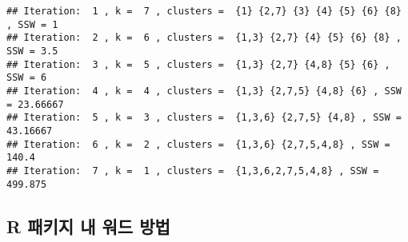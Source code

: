 \documentclass[]{book}
\newenvironment{Shaded}{\begin{snugshade}}{\end{snugshade}}
\newcommand{\CommentTok}[1]{\textcolor[rgb]{0.56,0.35,0.01}{\textit{#1}}}
\newcommand{\ControlFlowTok}[1]{\textcolor[rgb]{0.13,0.29,0.53}{\textbf{#1}}}
\newcommand{\DataTypeTok}[1]{\textcolor[rgb]{0.13,0.29,0.53}{#1}}
\newcommand{\DecValTok}[1]{\textcolor[rgb]{0.00,0.00,0.81}{#1}}
\newcommand{\KeywordTok}[1]{\textcolor[rgb]{0.13,0.29,0.53}{\textbf{#1}}}
\newcommand{\NormalTok}[1]{#1}
\newcommand{\OperatorTok}[1]{\textcolor[rgb]{0.81,0.36,0.00}{\textbf{#1}}}
\newcommand{\StringTok}[1]{\textcolor[rgb]{0.31,0.60,0.02}{#1}}
\begin{document}
\begin{Shaded}
\end{Shaded}

\begin{verbatim}
## Iteration:  1 , k =  7 , clusters =  {1} {2,7} {3} {4} {5} {6} {8} , SSW = 1 
## Iteration:  2 , k =  6 , clusters =  {1,3} {2,7} {4} {5} {6} {8} , SSW = 3.5 
## Iteration:  3 , k =  5 , clusters =  {1,3} {2,7} {4,8} {5} {6} , SSW = 6 
## Iteration:  4 , k =  4 , clusters =  {1,3} {2,7,5} {4,8} {6} , SSW = 23.66667 
## Iteration:  5 , k =  3 , clusters =  {1,3,6} {2,7,5} {4,8} , SSW = 43.16667 
## Iteration:  6 , k =  2 , clusters =  {1,3,6} {2,7,5,4,8} , SSW = 140.4 
## Iteration:  7 , k =  1 , clusters =  {1,3,6,2,7,5,4,8} , SSW = 499.875
\end{verbatim}

\hypertarget{ward-rpackages}{%
\subsection{R 패키지 내 워드 방법}\label{ward-rpackages}}
\end{document}
